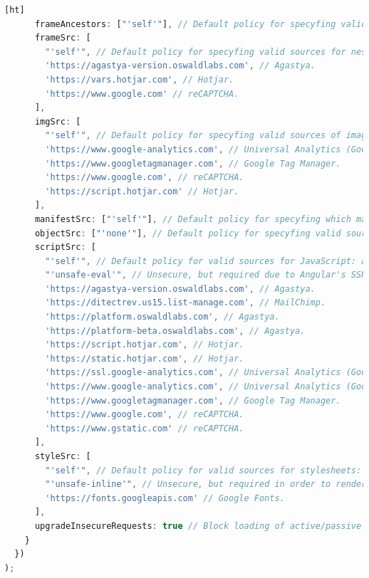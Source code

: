 \documentclass{article} %
\begin{document}
\begin{lstlisting}[language=JavaScript,firstnumber=1,label={lis:csp},caption={CSP for developed application.}][ht]
      frameAncestors: ["'self'"], // Default policy for specyfing valid parents that may embed a page using "<frame>", "<iframe>", "<object>", "<embed>", or "<applet>". This directive doesn't use "default-src" as fallback, thus by default it allows anything. This is basically clickjacking protection.
      frameSrc: [
        "'self'", // Default policy for specyfing valid sources for nested browsing contexts loading using elements such as "<frame>" and "<iframe>": allow all content coming from origin (without subdomains).
        'https://agastya-version.oswaldlabs.com', // Agastya.
        'https://vars.hotjar.com', // Hotjar.
        'https://www.google.com' // reCAPTCHA.
      ],
      imgSrc: [
        "'self'", // Default policy for specyfing valid sources of images and favicons: allow all content coming from origin (without subdomains).
        'https://www.google-analytics.com', // Universal Analytics (Google Analytics).
        'https://www.googletagmanager.com', // Google Tag Manager.
        'https://www.google.com', // reCAPTCHA.
        'https://script.hotjar.com' // Hotjar.
      ],
      manifestSrc: ["'self'"], // Default policy for specyfing which manifest can be applied to the resource: allow all content coming from origin (without subdomains).
      objectSrc: ["'none'"], // Default policy for specyfing valid sources for the "<object>", "<embed>", and "<applet>" elements. It also influences "pluginType" by disallowing all of them. The "pluginType" directive doesn't use "default-src" as fallback, thus by default it allows anything.
      scriptSrc: [
        "'self'", // Default policy for valid sources for JavaScript: allow all content coming from origin (without subdomains).
        "'unsafe-eval'", // Unsecure, but required due to Angular's SSR.
        'https://agastya-version.oswaldlabs.com', // Agastya.
        'https://ditectrev.us15.list-manage.com', // MailChimp.
        'https://platform.oswaldlabs.com', // Agastya.
        'https://platform-beta.oswaldlabs.com', // Agastya.
        'https://script.hotjar.com', // Hotjar.
        'https://static.hotjar.com', // Hotjar.
        'https://ssl.google-analytics.com', // Universal Analytics (Google Analytics).
        'https://www.google-analytics.com', // Universal Analytics (Google Analytics).
        'https://www.googletagmanager.com', // Google Tag Manager.
        'https://www.google.com', // reCAPTCHA.
        'https://www.gstatic.com' // reCAPTCHA.
      ],
      styleSrc: [
        "'self'", // Default policy for valid sources for stylesheets: allow all content coming from origin (without subdomains).
        "'unsafe-inline'", // Unsecure, but required in order to render styles generated by Angular compiler, which on SSR are generated as inline styles.
        'https://fonts.googleapis.com' // Google Fonts.
      ],
      upgradeInsecureRequests: true // Block loading of active/passive content over insecure FTP/HTTP by "upgrading" the connection to secure SFTP/HTTPS.
    }
  })
);
\end{lstlisting}
\end{document}
